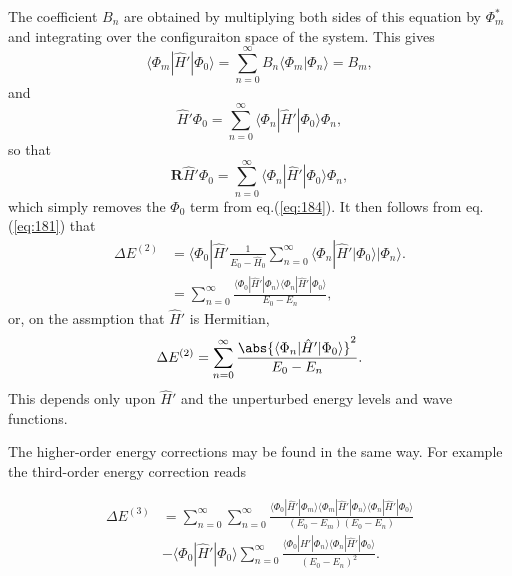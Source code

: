 The coefficient $B_n$ are obtained by multiplying both sides of this equation by $\Phi_m^*$ and integrating over the configuraiton space of the system. This gives
\begin{equation}
\nonumber
\langle  \Phi_m |\hat{H}'| \Phi_0 \rangle = \sum_{n=0}^{\infty} B_n \langle \Phi_m | \Phi_n \rangle = B_m,
\end{equation}
and
\begin{equation}
\label{eq:184}
\hat{H}' \Phi_0  = \sum_{n=0}^{\infty} \langle \Phi_n |\hat{H}'| \Phi_0 \rangle \Phi_n,
\end{equation}
so that 
\begin{equation}
\nonumber
\mathbf{R} \hat{H}' \Phi_0  = \sum_{n=0}^{\infty} \langle \Phi_n |\hat{H}'| \Phi_0 \rangle \Phi_n,
\end{equation}
which simply removes the $\Phi_0$ term from eq.(\ref{eq:184}). It then follows from eq.(\ref{eq:181}) that 
\begin{align}
\nonumber
\Delta E^{(2)} &= \langle   \Phi_0  | \hat{H}'  \frac{1}{E_0 - \hat{H}_0}  \sum_{n=0}^{\infty} \langle \Phi_n |\hat{H}'| \Phi_0 \rangle |   \Phi_n \rangle. \\
&= \sum_{n=0}^{\infty} \frac{\langle \Phi_0 |\hat{H}'| \Phi_n  \rangle \langle \Phi_n |\hat{H}'| \Phi_0 \rangle}{E_0 - E_n}, \nonumber
\end{align}
or, on the assmption that $\hat{H}'$ is Hermitian,
\begin{equation}
\label{eq:2ndOrderMBPT}
\Delta E^{(2)} = \sum_{n=0}^{\infty} \frac{ \abs{ \langle \Phi_n |\hat{H}'| \Phi_0  \rangle }^2}{E_0 - E_n}.
\end{equation}
This depends only upon $\hat{H}'$ and the unperturbed energy levels and wave functions.

The higher-order energy corrections may be found in the same way. For example the third-order energy correction reads

\begin{align}
\label{eq:3rdOrderMBPT}
\Delta E^{(3)} &= \sum_{n=0}^{\infty} \sum_{n=0}^{\infty}  \frac{  \langle \Phi_0 |\hat{H}'| \Phi_m  \rangle  \langle \Phi_m |\hat{H}'| \Phi_n  \rangle \langle \Phi_n |\hat{H}'| \Phi_0  \rangle }{(E_0 - E_m)(E_0 - E_n)} \\ \nonumber
&  - \langle \Phi_0 |\hat{H}'| \Phi_0  \rangle \sum_{n=0}^{\infty} \frac{ \langle \Phi_0 |\hat{H}'| \Phi_n  \rangle \langle \Phi_n |\hat{H}'| \Phi_0  \rangle }{(E_0 - E_n)^2}.
\end{align}

